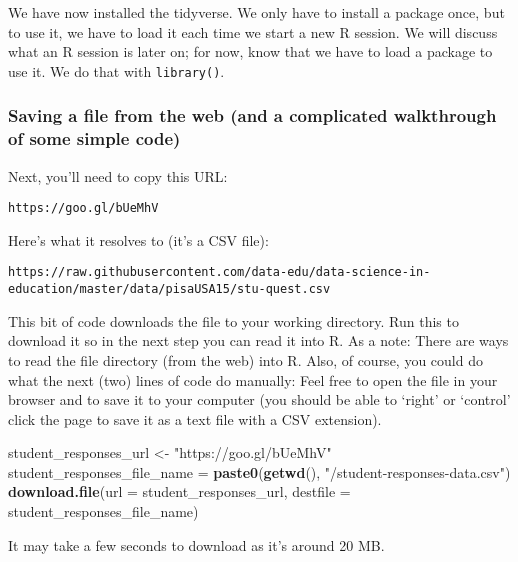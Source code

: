 \documentclass[]{article}
\newenvironment{Shaded}{\begin{snugshade}}{\end{snugshade}}
\newcommand{\KeywordTok}[1]{\textcolor[rgb]{0.13,0.29,0.53}{\textbf{#1}}}
\newcommand{\DataTypeTok}[1]{\textcolor[rgb]{0.13,0.29,0.53}{#1}}
\newcommand{\StringTok}[1]{\textcolor[rgb]{0.31,0.60,0.02}{#1}}
\newcommand{\NormalTok}[1]{#1}
\begin{document}
We have now installed the tidyverse. We only have to install a package
once, but to use it, we have to load it each time we start a new R
session. We will discuss what an R session is later on; for now, know
that we have to load a package to use it. We do that with
\texttt{library()}.

\subsubsection{Saving a file from the web (and a complicated walkthrough
of some simple
code)}\label{saving-a-file-from-the-web-and-a-complicated-walkthrough-of-some-simple-code}

Next, you'll need to copy this URL:

\texttt{https://goo.gl/bUeMhV}

Here's what it resolves to (it's a CSV file):

\texttt{https://raw.githubusercontent.com/data-edu/data-science-in-education/master/data/pisaUSA15/stu-quest.csv}

This bit of code downloads the file to your working directory. Run this
to download it so in the next step you can read it into R. As a note:
There are ways to read the file directory (from the web) into R. Also,
of course, you could do what the next (two) lines of code do manually:
Feel free to open the file in your browser and to save it to your
computer (you should be able to `right' or `control' click the page to
save it as a text file with a CSV extension).

\begin{Shaded}
\begin{Highlighting}[]
\NormalTok{student_responses_url <-}\StringTok{ "https://goo.gl/bUeMhV"}
\NormalTok{student_responses_file_name =}\StringTok{ }\KeywordTok{paste0}\NormalTok{(}\KeywordTok{getwd}\NormalTok{(), }\StringTok{"/student-responses-data.csv"}\NormalTok{)}
\KeywordTok{download.file}\NormalTok{(}\DataTypeTok{url =}\NormalTok{ student_responses_url, }\DataTypeTok{destfile =}\NormalTok{ student_responses_file_name)}
\end{Highlighting}
\end{Shaded}

It may take a few seconds to download as it's around 20 MB.
\end{document}
